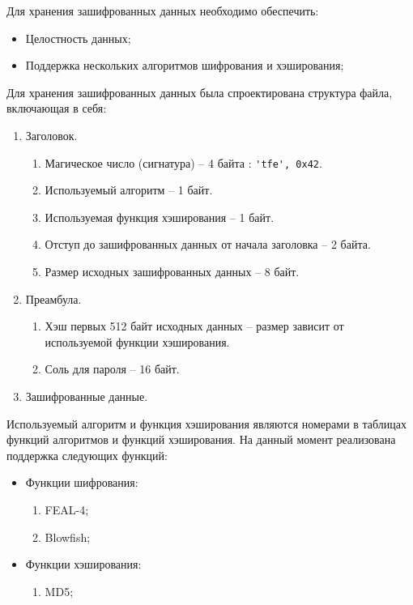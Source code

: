 Для хранения зашифрованных данных необходимо обеспечить:
\begin{itemize}
    \item Целостность данных;
    \item Поддержка нескольких алгоритмов шифрования и хэширования;
\end{itemize}

Для хранения зашифрованных данных была спроектирована структура файла,
включающая в себя:
\begin{enumerate}
  \item Заголовок.
  \begin{enumerate}
    \item Магическое число (сигнатура) -- 4 байта : \verb"'tfe', 0x42".
    \item Используемый алгоритм -- 1 байт.
    \item Используемая функция хэширования -- 1 байт.
    \item Отступ до зашифрованных данных от начала заголовка -- 2 байта.
    \item Размер исходных зашифрованных данных -- 8 байт.
  \end{enumerate}
  \item Преамбула.
  \begin{enumerate}
    \item Хэш первых 512 байт исходных данных -- размер зависит от
    используемой функции хэширования.
    \item Соль для пароля -- 16 байт.
  \end{enumerate}
  \item Зашифрованные данные.
\end{enumerate}

Используемый алгоритм и функция хэширования являются номерами
в таблицах функций алгоритмов и функций хэширования. На данный
момент реализована поддержка следующих функций:
\begin{itemize}
  \item Функции шифрования:
  \begin{enumerate}
    \item FEAL-4;
    \item Blowfish;
  \end{enumerate}
  \item Функции хэширования:
  \begin{enumerate}
    \item MD5;
  \end{enumerate}
\end{itemize}

